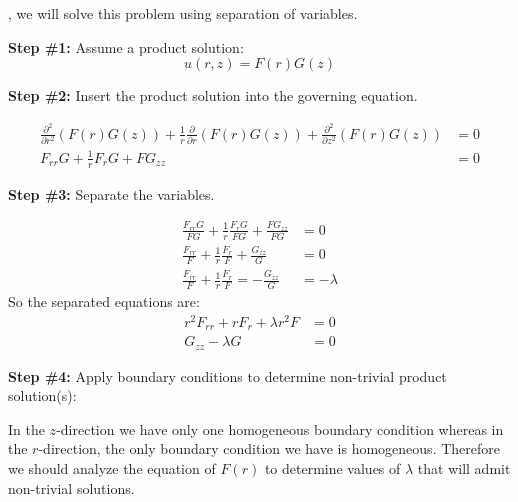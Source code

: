 , we will solve this problem using separation of variables.

\vspace{0.25cm}

\noindent\textbf{Step \#1:} Assume a product solution:
\begin{equation*}
u(r,z) = F(r)G(z)
\end{equation*}

\vspace{5.0cm}

\noindent\textbf{Step \#2:} Insert the product solution into the governing equation.

\begin{align*}
\frac{\partial^2}{\partial r^2}\left(F(r)G(z) \right) + \frac{1}{r}\frac{\partial}{\partial r}\left(F(r) G(z)\right) + \frac{\partial^2}{\partial z^2}\left( F(r)G(z)\right) &= 0 \\
F_{rr}G + \frac{1}{r}F_rG + FG_{zz} &= 0
\end{align*}

\vspace{0.25cm}

\noindent\textbf{Step \#3:} Separate the variables.

\begin{align*}
\frac{F_{rr}G}{FG} + \frac{1}{r}\frac{F_r G}{FG} + \frac{FG_{zz}}{FG} &= 0 \\
\frac{F_{rr}}{F} + \frac{1}{r}\frac{F_r}{F} + \frac{G_{zz}}{G} &= 0 \\
\frac{F_{rr}}{F} + \frac{1}{r}\frac{F_r}{F} = -\frac{G_{zz}}{G} &= -\lambda
\end{align*}
So the separated equations are:
\begin{align*}
r^2F_{rr} + rF_r + \lambda r^2 F &= 0 \\
G_{zz} - \lambda G &= 0
\end{align*}

\noindent\textbf{Step \#4:} Apply boundary conditions to determine non-trivial product solution(s):

\vspace{0.25cm}

\noindent In the $z$-direction we have only one homogeneous boundary condition whereas in the $r$-direction, the only boundary condition we have is homogeneous.  Therefore we should analyze the equation of $F(r)$ to determine values of $\lambda$ that will admit non-trivial solutions.

